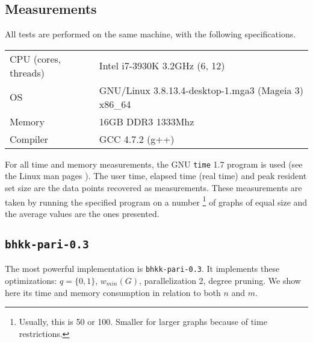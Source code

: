 \documentclass[a4paper]{article}
\newcommand{\code}{\texttt}
\begin{document}
\subsection{Measurements}
All tests are performed on the same machine, with the following specifications.

\begin{center}
\begin{tabular}{l|l}
CPU (cores, threads) & Intel i7-3930K 3.2GHz (6, 12) \\ 
OS & GNU/Linux 3.8.13.4-desktop-1.mga3 (Mageia 3) x86\_64 \\ 
Memory & 16GB DDR3 1333Mhz \\ 
Compiler & GCC 4.7.2 (g++) \\ 
\end{tabular}
\end{center}

For all time and memory measurements, the GNU \code{time} 1.7 program is used (see the Linux man pages \cite{time}). The user time, elapsed time (real time) and peak resident set size are the data points recovered as measurements. These measurements are taken by running the specified program on a number
\footnote{Usually, this is 50 or 100. Smaller for larger graphs because of time restrictions.} 
of graphs of equal size and the average values are the ones presented.

\subsection{\code{bhkk-pari-0.3}}
The most powerful implementation is \code{bhkk-pari-0.3}. It implements these optimizations: $q = \{0, 1\}$, $w_{min}(G)$, parallelization 2, degree pruning. We show here its time and memory consumption in relation to both $n$ and $m$.
\end{document}
